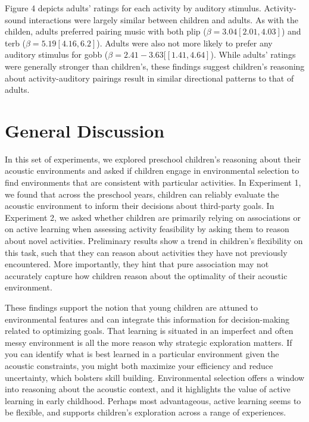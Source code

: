 \documentclass[10pt, letterpaper]{article}
\begin{document}
Figure 4 depicts adults' ratings for each activity by auditory stimulus.
Activity-sound interactions were largely similar between children and
adults. As with the childen, adults preferred pairing music with both
plip (\(\beta = 3.04 [2.01, 4.03]\)) and terb
(\(\beta = 5.19 [4.16, 6.2]\)). Adults were also not more likely to
prefer any auditory stimulus for gobb
(\(\beta = 2.41 - 3.63 [[1.41, 4.64]\)). While adults' ratings were
generally stronger than children's, these findings suggest children's
reasoning about activity-auditory pairings result in similar directional
patterns to that of adults.

\hypertarget{general-discussion}{%
\section{General Discussion}\label{general-discussion}}

In this set of experiments, we explored preschool children's reasoning
about their acoustic environments and asked if children engage in
environmental selection to find environments that are consistent with
particular activities. In Experiment 1, we found that across the
preschool years, children can reliably evaluate the acoustic environment
to inform their decisions about third-party goals. In Experiment 2, we
asked whether children are primarily relying on associations or on
active learning when assessing activity feasibility by asking them to
reason about novel activities. Preliminary results show a trend in
children's flexibility on this task, such that they can reason about
activities they have not previously encountered. More importantly, they
hint that pure association may not accurately capture how children
reason about the optimality of their acoustic environment.

These findings support the notion that young children are attuned to
environmental features and can integrate this information for
decision-making related to optimizing goals. That learning is situated
in an imperfect and often messy environment is all the more reason why
strategic exploration matters. If you can identify what is best learned
in a particular environment given the acoustic constraints, you might
both maximize your efficiency and reduce uncertainty, which bolsters
skill building. Environmental selection offers a window into reasoning
about the acoustic context, and it highlights the value of active
learning in early childhood. Perhaps most advantageous, active learning
seems to be flexible, and supports children's exploration across a range
of experiences.
\end{document}
